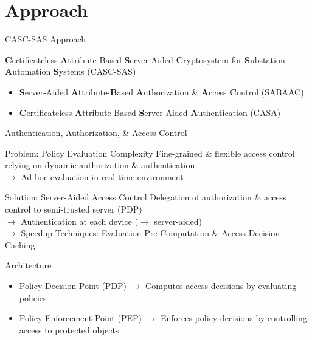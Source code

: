 \documentclass[en]{sdqbeamer}
\begin{document}
\section{Approach}
\begin{frame}{CASC-SAS Approach}
    \begin{greenblock}{\textbf{C}ertificateless \textbf{A}ttribute-Based \textbf{S}erver-Aided \textbf{C}ryptosystem for \textbf{S}ubstation \textbf{A}utomation \textbf{S}ystems (CASC-SAS)}
        \begin{itemize}
            \item \textbf{S}erver-Aided \textbf{A}ttribute-\textbf{B}ased \textbf{A}uthorization \& \textbf{A}ccess \textbf{C}ontrol (SABAAC)
            \item \textbf{C}ertificateless \textbf{A}ttribute-Based \textbf{S}erver-Aided \textbf{A}uthentication (CASA)
        \end{itemize}
    \end{greenblock}
\end{frame}
\begin{frame}{Authentication, Authorization, \& Access Control}
    \begin{redblock}{Problem: Policy Evaluation Complexity}
        Fine-grained \& flexible access control relying on dynamic authorization \& authentication
        \\$\rightarrow$ Ad-hoc evaluation in real-time environment
    \end{redblock}

    \begin{greenblock}{Solution: Server-Aided Access Control}
        Delegation of authorization \& access control to semi-trusted server (PDP)
        \\$\rightarrow$ Authentication at each device ($\rightarrow$ server-aided)
        \\$\rightarrow$ Speedup Techniques: Evaluation Pre-Computation \& Access Decision Caching
    \end{greenblock}

    \begin{grayblock}{Architecture \parencite{Hu2014,Oasis2013}}
        \begin{itemize}
            \item Policy Decision Point (PDP) $\rightarrow$ Computes access decisions by evaluating policies
            \item Policy Enforcement Point (PEP) $\rightarrow$ Enforces policy decisions by controlling access to protected objects
        \end{itemize}
    \end{grayblock}
\end{frame}
\end{document}
